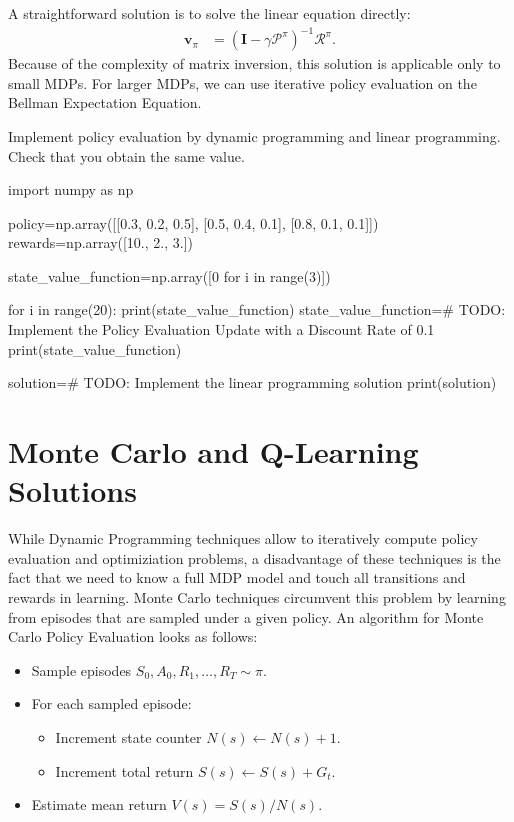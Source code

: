 \noindent A straightforward solution is to solve the linear equation directly:
\begin{align*}
    \boldsymbol{v}_{\pi} & = (\boldsymbol{I} -  \gamma \boldsymbol{\mathcal{P}}^{\pi})^{-1} \boldsymbol{\mathcal{R}}^{\pi}.
\end{align*}
Because of the complexity of matrix inversion, this solution is applicable only to small MDPs. For larger MDPs, we can use iterative policy evaluation on the Bellman Expectation Equation.

\begin{exercise}
\label{exercise:PolicyEvaluation}
Implement policy evaluation by dynamic programming and linear programming. Check that you obtain the same value.

\begin{python}
import numpy as np

policy=np.array([[0.3, 0.2, 0.5], [0.5, 0.4, 0.1], [0.8, 0.1, 0.1]])
rewards=np.array([10., 2., 3.])

state_value_function=np.array([0 for i in range(3)])

for i in range(20):
    print(state_value_function)
    state_value_function=# TODO: Implement the Policy Evaluation Update with a Discount Rate of 0.1
print(state_value_function)

solution=# TODO: Implement the linear programming solution
print(solution)
\end{python}
\end{exercise}

\section{Monte Carlo and Q-Learning Solutions}

While Dynamic Programming techniques allow to iteratively compute policy evaluation and optimiziation problems, a disadvantage of these techniques is the fact that we need to know a full MDP model and touch all transitions and rewards in learning. Monte Carlo techniques circumvent this problem by learning from episodes that are sampled under a given policy. An algorithm for Monte Carlo Policy Evaluation looks as follows: 
\begin{itemize}
  \item Sample episodes $S_0, A_0, R_1, \ldots, R_T \sim \pi$.
    \item For each sampled episode:
  \begin{itemize}
  \item Increment state counter $N(s) \leftarrow N(s) + 1$.
  \item Increment total return $S(s) \leftarrow S(s) + G_t$.
    \end{itemize}
  \item Estimate mean return $V(s) = S(s)/N(s)$.
  \end{itemize}

